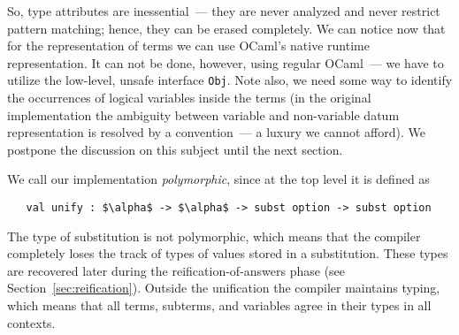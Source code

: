 So, type attributes are inessential~--- they are never analyzed and never restrict pattern matching; hence,
they can be erased completely.
We can notice now that for the representation of terms we can use OCaml's native runtime representation.
It can not be done, however, using regular OCaml~--- we have to utilize the low-level, unsafe interface \lstinline|Obj|.
Note also, we need some way to identify the occurrences of logical variables inside the terms (in the original \miniKanren{} implementation the ambiguity between variable and non-variable datum representation is resolved by a convention~--- a luxury we cannot afford).
We postpone the discussion on this subject until the next section.



We call our implementation \emph{polymorphic}, since at the top level it is defined as

\begin{lstlisting}
   val unify : $\alpha$ -> $\alpha$ -> subst option -> subst option
\end{lstlisting}

The type of substitution is not polymorphic, which means that the compiler completely loses the track
of types of values stored in a substitution. These types are recovered later during the reification-of-answers phase (see Section~\ref{sec:reification}).
Outside the unification the compiler maintains typing, which means that all terms, subterms, and variables agree in their types
in all contexts.
